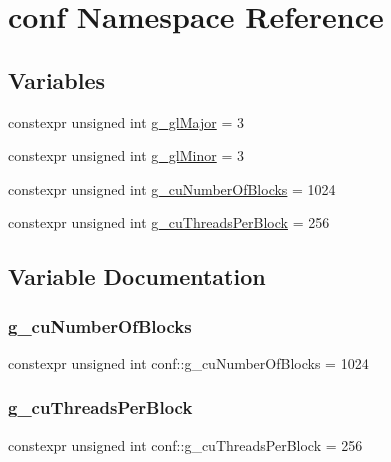 \hypertarget{namespaceconf}{}\section{conf Namespace Reference}
\label{namespaceconf}
\subsection*{Variables}
\begin{DoxyCompactItemize}
\item 
constexpr unsigned int \mbox{\hyperlink{namespaceconf_acc43f747362be61710fbb695f123a09d}{g\+\_\+gl\+Major}} = 3
\item 
constexpr unsigned int \mbox{\hyperlink{namespaceconf_adbe23fd53e5cda0c75d8286fabf3b570}{g\+\_\+gl\+Minor}} = 3
\item 
constexpr unsigned int \mbox{\hyperlink{namespaceconf_ad869531faabeab0398cdda5c77e0e82c}{g\+\_\+cu\+Number\+Of\+Blocks}} = 1024
\item 
constexpr unsigned int \mbox{\hyperlink{namespaceconf_a2d494e9e62094bc07dd553d707881e2c}{g\+\_\+cu\+Threads\+Per\+Block}} = 256
\end{DoxyCompactItemize}


\subsection{Variable Documentation}
\mbox{\label{namespaceconf_ad869531faabeab0398cdda5c77e0e82c}} 
\subsubsection{\texorpdfstring{g\+\_\+cu\+Number\+Of\+Blocks}{g\_cuNumberOfBlocks}}
{\footnotesize\ttfamily constexpr unsigned int conf\+::g\+\_\+cu\+Number\+Of\+Blocks = 1024}

\mbox{\label{namespaceconf_a2d494e9e62094bc07dd553d707881e2c}} 
\subsubsection{\texorpdfstring{g\+\_\+cu\+Threads\+Per\+Block}{g\_cuThreadsPerBlock}}
{\footnotesize\ttfamily constexpr unsigned int conf\+::g\+\_\+cu\+Threads\+Per\+Block = 256}

